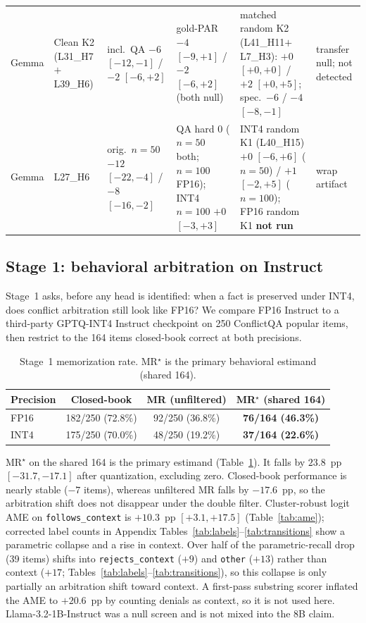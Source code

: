 \documentclass{article} %
\begin{document}
\begin{table}[t]
\begin{tabular}{llp{1.28in}p{1.28in}p{1.15in}p{0.78in}}
Gemma & Clean K2 (L31\_H7$+$L39\_H6) & incl.\ QA $-6$ $[-12,-1]$ / $-2$ $[-6,+2]$ & gold-PAR $-4$ $[-9,+1]$ / $-2$ $[-6,+2]$ (both null) & matched random K2 (L41\_H11$+$L7\_H3): $+0$ $[+0,+0]$ / $+2$ $[+0,+5]$; spec.\ $-6$ / $-4$ $[-8,-1]$ & transfer null; not detected \\
Gemma & L27\_H6 & orig.\ $n{=}50$ $-12$ $[-22,-4]$ / $-8$ $[-16,-2]$ & QA hard $0$ ($n{=}50$ both; $n{=}100$ FP16); INT4 $n{=}100$ $+0$ $[-3,+3]$ & INT4 random K1 (L40\_H15) $+0$ $[-6,+6]$ ($n{=}50$) / $+1$ $[-2,+5]$ ($n{=}100$); FP16 random K1 \textbf{not run} & wrap artifact \\
\bottomrule
\end{tabular}
\end{table}

\subsection{Stage 1: behavioral arbitration on Instruct}
\label{sec:stage1}

Stage~1 asks, before any head is identified: when a fact is preserved under INT4, does conflict arbitration still look like FP16? We compare FP16 Instruct to a third-party GPTQ-INT4 Instruct checkpoint on 250 ConflictQA popular items, then restrict to the 164 items closed-book correct at both precisions.

\begin{table}[t]
\caption{Stage~1 memorization rate. MR$^\star$ is the primary behavioral estimand (shared 164).}
\label{tab:mrstar}
\centering
\small
\begin{tabular}{lccc}
\toprule
Precision & Closed-book & MR (unfiltered) & MR$^\star$ (shared 164) \\
\midrule
FP16 & 182/250 (72.8\%) & 92/250 (36.8\%) & \textbf{76/164 (46.3\%)} \\
INT4 & 175/250 (70.0\%) & 48/250 (19.2\%) & \textbf{37/164 (22.6\%)} \\
\bottomrule
\end{tabular}
\end{table}MR$^\star$ on the shared 164 is the primary estimand (Table~\ref{tab:mrstar}). It falls by $23.8$~pp $[-31.7,-17.1]$ after quantization, excluding zero. Closed-book performance is nearly stable ($-7$ items), whereas unfiltered MR falls by $-17.6$~pp, so the arbitration shift does not disappear under the double filter. Cluster-robust logit AME on \texttt{follows\_context} is $+10.3$~pp $[+3.1,+17.5]$ (Table~\ref{tab:ame}); corrected label counts in Appendix Tables~\ref{tab:labels}--\ref{tab:transitions} show a parametric collapse and a rise in context. Over half of the parametric-recall drop (39 items) shifts into \texttt{rejects\_context} ($+9$) and \texttt{other} ($+13$) rather than context ($+17$; Tables~\ref{tab:labels}--\ref{tab:transitions}), so this collapse is only partially an arbitration shift toward context. A first-pass substring scorer inflated the AME to $+20.6$~pp by counting denials as context, so it is not used here. Llama-3.2-1B-Instruct was a null screen and is not mixed into the 8B claim.
\end{document}
